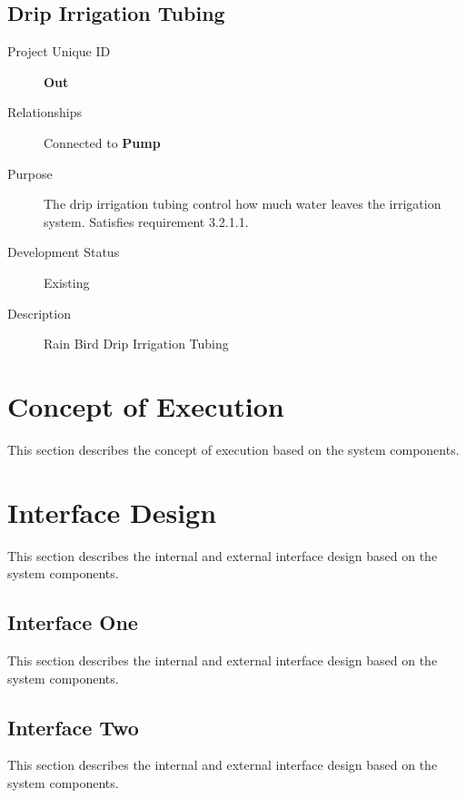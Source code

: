 \subsection{Drip Irrigation Tubing}

\begin{description}
    \item[Project Unique ID] \textbf{Out}
    \item[Relationships] Connected to \textbf{Pump}
    \item[Purpose] The drip irrigation tubing control how much water leaves the irrigation system. Satisfies requirement 3.2.1.1.
    \item[Development Status] Existing
    \item[Description] Rain Bird Drip Irrigation Tubing
\end{description}


\section{Concept of Execution}
\label{loc:ConceptOfEExecution}


This section describes the concept of execution based on the system components.


\section{Interface Design}
\label{loc:InterfaceDesign}


This section describes the internal and external interface design based on the system components.


\subsection{Interface One}
\label{loc:InterfaceOne}


This section describes the internal and external interface design based on the system components.

\subsection{Interface Two}
\label{loc:InterfaceTwo}
%

This section describes the internal and external interface design based on the system components.
